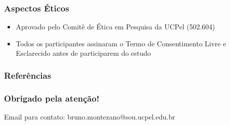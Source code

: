 \documentclass{beamer}
\begin{document}
\begin{frame}
\frametitle{Aspectos Éticos}

    \Large
    \begin{itemize}
        \item Aprovado pelo Comitê de Ética em Pesquisa da UCPel (502.604)
        \item Todos os participantes assinaram o Termo de Consentimento Livre e Esclarecido antes de participarem do estudo
    \end{itemize}

\end{frame}

\begin{frame}[shrink=20]
\frametitle{Referências}

\printbibliography

\end{frame}

\begin{frame}
\frametitle{Obrigado pela atenção!}

    \begin{block}{Email para contato:}
        bruno.montezano@sou.ucpel.edu.br
    \end{block}

\end{frame}
\end{document}
